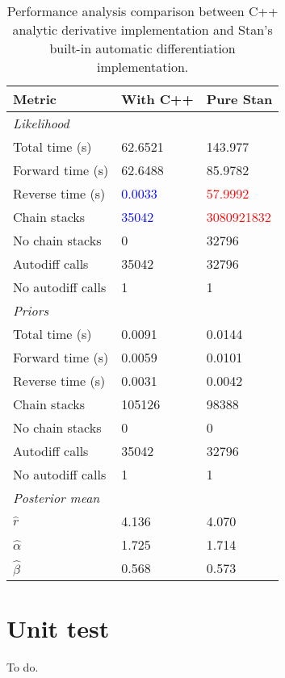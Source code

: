 \documentclass[11pt]{article}
\begin{document}
\begin{table}[H]
\tabcolsep=0.4cm
\begin{longtable}{lll}
    \toprule
    \textbf{Metric} & \textbf{With C++} & \textbf{Pure Stan} \\
    \midrule
    \endfirsthead
 	
    \multicolumn{3}{l}{\textit{Likelihood}} \\
    Total time (s) & 62.6521 & 143.977 \\
    Forward time (s) & 62.6488 & 85.9782 \\
    Reverse time (s) & \textcolor{blue}{0.0033} & \textcolor{red}{57.9992} \\
    Chain stacks & \textcolor{blue}{35042} & \textcolor{red}{3080921832} \\
    No chain stacks & 0 & 32796 \\
    Autodiff calls & 35042 & 32796 \\
    No autodiff calls & 1 & 1 \\
    \midrule
    \multicolumn{3}{l}{\textit{Priors}} \\
    Total time (s) & 0.0091 & 0.0144 \\
    Forward time (s) & 0.0059 & 0.0101 \\
    Reverse time (s) & 0.0031 & 0.0042 \\
    Chain stacks & 105126 & 98388 \\
    No chain stacks & 0 & 0 \\
    Autodiff calls & 35042 & 32796 \\
    No autodiff calls & 1 & 1 \\
    \midrule
    \multicolumn{3}{l}{\textit{Posterior mean}} \\
    $\hat r$  & 4.136 & 4.070 \\
    $\hat \alpha$ & 1.725 & 1.714 \\
    $\hat \beta$ & 0.568 & 0.573 \\
    \bottomrule
\end{longtable}
\caption{Performance analysis comparison between C++ analytic derivative implementation and Stan's built-in automatic differentiation implementation.}
\end{table}




\section{Unit test}
To do.







\clearpage

 
\end{document}
